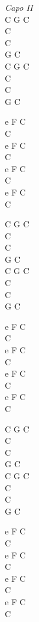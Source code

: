 \begin{chord}
    \textit{Capo II}\\
    C G C\\
    C\\
    C\\
    G C\\
    C G C\\
    C\\
    C\\
    G C

    e F C\\
    C\\
    e F C\\
    C\\
    e F C\\
    C\\
    e F C\\
    C

    C G C\\
    C\\
    C\\
    G C\\
    C G C\\
    C\\
    C\\
    G C

    e F C\\
    C\\
    e F C\\
    C\\
    e F C\\
    C\\
    e F C\\
    C

    C G C\\
    C\\
    C\\
    G C\\
    C G C\\
    C\\
    C\\
    G C

    e F C\\
    C\\
    e F C\\
    C\\
    e F C\\
    C\\
    e F C\\
    C
    \end{chord}
\vfill
